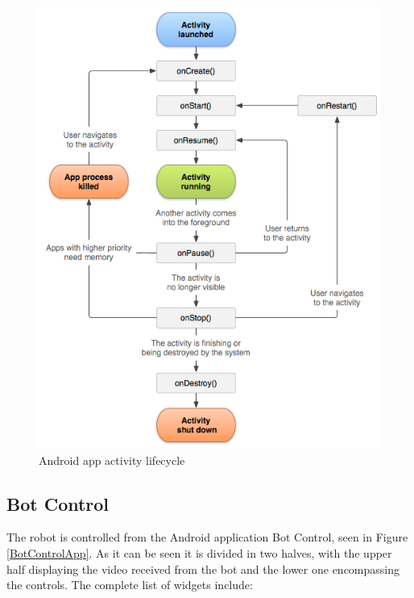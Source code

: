 	
	\begin{figure}[H]
      \centering
      \includegraphics[scale=.8]{images/Diagrams/android_activity_lifecycle.png}
      \caption{Android app activity lifecycle }
      \label{androidActivity}
  	\end{figure}
  	\bigskip




\subsection{Bot Control}

The robot is controlled from the Android application Bot Control, seen in Figure \ref{BotControlApp}. As it can be seen it is divided in two halves, with the upper half displaying the video received from the bot and the lower one encompassing the controls. The complete list of widgets include:

